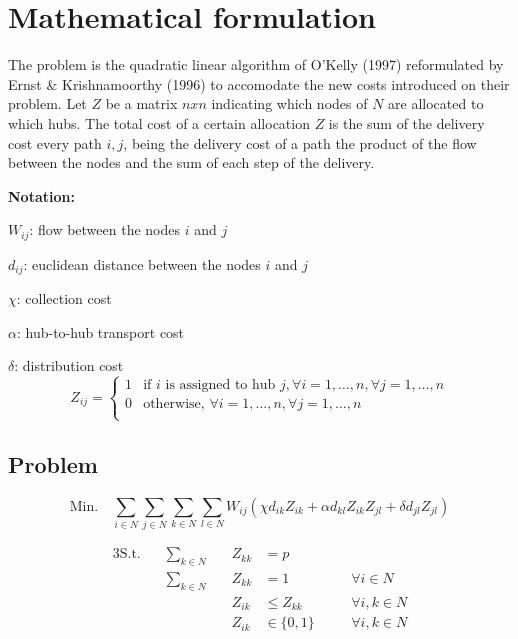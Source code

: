 \section{Mathematical formulation}

The problem  is the quadratic linear algorithm of O'Kelly (1997)\cite{OKelly1987}
reformulated by Ernst \& Krishnamoorthy (1996)\cite{Ernst1996} to accomodate the new costs
introduced on their problem. Let $Z$ be a matrix $nxn$ indicating which nodes of $N$ are allocated
to which hubs. The total cost of a certain allocation $Z$ is the sum of the delivery cost every
path $i,j$, being the delivery cost of a path the product of the flow between the nodes and the 
sum of each step of the delivery.

\hfill

\textbf{Notation:}

$W_{ij}$: flow between the nodes $i$ and $j$

$d_{ij}$: euclidean distance between the nodes $i$ and $j$

$\chi$: collection cost

$\alpha$: hub-to-hub transport cost

$\delta$: distribution cost
\[
Z_{ij} = \begin{cases}
  1 & \text{if } i \text{ is assigned to hub } j, \forall i = 1,\dots,n, \forall j = 1,\dots,n \\
  0 & \text{otherwise, }\forall i = 1,\dots,n, \forall j = 1,\dots,n \\
\end{cases}
\]

\subsection{Problem }

\[
  \text{Min.} \quad \sum_{i\in N}\sum_{j\in N}\sum_{k\in N}\sum_{l\in N} W_{ij}(\chi d_{ik} Z_{ik} + \alpha d_{kl} Z_{ik} Z_{jl} + \delta d_{jl} Z_{jl})
\]

\begin{alignat}{3}
  \text{S.t.} \quad & \sum_{k \in N} & \quad Z_{kk} &= p         & \label{p_hubs}\\
                    & \sum_{k \in N} & \quad Z_{kk} &= 1         & \quad & \forall i \in N \label{eq:single_alloc} \\
                    &                & \quad Z_{ik} &\le Z_{kk}  & \quad & \forall i, k \in N \label{eq:only_hubs} \\
                    &                & \quad Z_{ik} &\in \{0,1\} & \quad & \forall i, k \in N \label{eq:prev_alloc}
\end{alignat}

